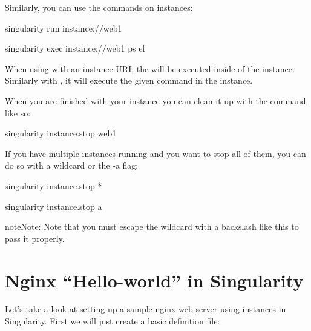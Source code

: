 \documentclass[letterpaper,10pt,english]{sphinxmanual}
\begin{document}
Similarly, you can use the  commands on instances:

%
\begin{sphinxVerbatim}[commandchars=\\\{\}]
\PYGZdl{} singularity run instance://web1

\PYGZdl{} singularity exec instance://web1 ps \PYGZhy{}ef
\end{sphinxVerbatim}

When using  with an instance URI, the  will be executed inside of the
instance. Similarly with , it will execute the given command in the
instance.

When you are finished with your instance you can clean it up with the
 command like so:

%
\begin{sphinxVerbatim}[commandchars=\\\{\}]
\PYGZdl{} singularity instance.stop web1
\end{sphinxVerbatim}

If you have multiple instances running and you want to stop all of
them, you can do so with a wildcard or the -a flag:

%
\begin{sphinxVerbatim}[commandchars=\\\{\}]
\PYGZdl{} singularity instance.stop \PYGZbs{}*

\PYGZdl{} singularity instance.stop \PYGZhy{}a
\end{sphinxVerbatim}

\begin{sphinxadmonition}{note}{Note:}
Note that you must escape the wildcard with a backslash like this \sphinxcode{\sphinxupquote{\textbackslash{}*}} to
pass it properly.
\end{sphinxadmonition}


\section{Nginx “Hello-world” in Singularity}
\label{\detokenize{running_services:nginx-hello-world-in-singularity}}
Let’s take a look at setting up a sample nginx web server using
instances in Singularity. First we will just create a basic definition
file:
\end{document}
